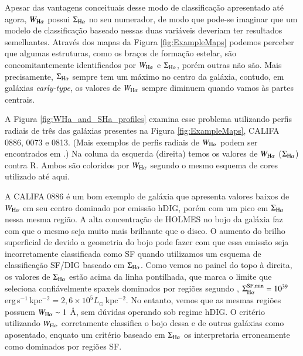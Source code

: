 Apesar das vantagens conceituais desse modo de classificação apresentado até agora, $W_{\Ha}$ possui $\Sigma_{\Ha}$ no seu numerador, de modo que pode-se imaginar que um modelo de classificação baseado nessas duas variáveis deveriam ter resultados semelhantes. Através dos mapas da Figura \ref{fig:ExampleMaps} podemos perceber que algumas estruturas, como os braços de formação estelar, são concomitantemente identificados por $W_{\Ha}$ e $\Sigma_{\Ha}$, porém outras não são. Mais precisamente, $\Sigma_{\Ha}$ sempre tem um máximo no centro da galáxia, contudo, em galáxias {\em early-type}, os valores de $W_{\Ha}$ sempre diminuem quando vamos às partes centrais.

A Figura \ref{fig:WHa_and_SHa_profiles} examina esse problema utilizando perfis radiais de três das galáxias presentes na Figura \ref{fig:ExampleMaps}, CALIFA 0886, 0073 e 0813. (Mais exemplos de perfis radiais de $W_{\Ha}$ podem ser encontrados em \citealt{Papaderos.etal.2013, Belfiore.etal.2016, Belfiore.etal.2017, Gomes.etal.2016b, GonzalezDelgado.etal.2016a}.) Na coluna da esquerda (direita) temos os valores de $W_{\Ha}$ ($\Sigma_{\Ha}$) contra R. Ambos são coloridos por $W_{\Ha}$ segundo o mesmo esquema de cores utilizado até aqui.

A CALIFA 0886 é um bom exemplo de galáxia que apresenta valores baixos de $W_{\Ha}$ em seu centro dominado por emissão hDIG, porém com um pico em $\Sigma_{\Ha}$ nessa mesma região. A alta concentração de HOLMES no bojo da galáxia faz com que o mesmo seja muito mais brilhante que o disco. O aumento do brilho superficial de \Ha devido a geometria do bojo pode fazer com que essa emissão seja incorretamente classificada como SF quando utilizamos um esquema de classificação SF/DIG baseado em $\Sigma_{\Ha}$. Como vemos no painel do topo à direita, os valores de $\Sigma_{\Ha}$ estão acima da linha pontilhada, que marca o limite que seleciona confiávelmente spaxels dominados por regiões \hii segundo \citet{Zhang.etal.2017a}, $\Sigma^{\rm SF,min}_{\Ha} = 10^{39}$ erg$\,$s$^{-1}\,$kpc$^{-2} =  2,6 \times 10^{5} L_\odot\,$kpc$^{-2}$. No entanto, vemos que as mesmas regiões possuem $W_{\Ha} \sim 1$ \AA, sem dúvidas operando sob regime hDIG. O critério utilizando $W_{\Ha}$ corretamente classifica o bojo dessa e de outras galáxias como aposentado, enquato um critério baseado em $\Sigma_{\Ha}$ os interpretaria erroneamente como dominados por regiões SF.

